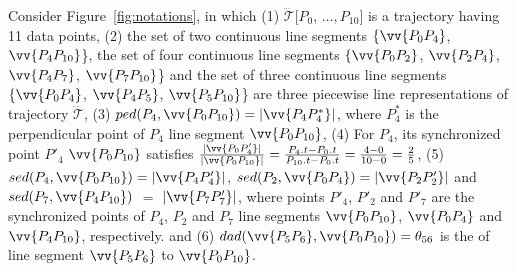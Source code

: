 \begin{example}
	\label{exm-notations}
	Consider Figure~\ref{fig:notations}, in which
	(1) $\dddot{\mathcal{T}}[P_0$, $\ldots, P_{10}]$ is a trajectory having 11 data points,
    (2) the set of two continuous line segments $\{\vv{P_0P_4}$, $\vv{P_4P_{10}}$\}, the set of four continuous line segments $\{\vv{P_0P_2}$, $\vv{P_2P_4}$, $\vv{P_4P_7}$, $\vv{P_7P_{10}}$\} and the set of three continuous line segments $\{\vv{P_0P_4}$, $\vv{P_4P_5}$, $\vv{P_5P_{10}}$\} are three piecewise line representations of trajectory $\dddot{\mathcal{T}}$,
	(3) $ped(P_4, \vv{P_0P_{10}})=|\vv{P_4P^*_4}|$, where $P^*_4$ is the perpendicular point of $P_4$ \wrt line segment $\vv{P_0P_{10}}$,
	(4) For $P_4$, its synchronized point $P'_4$ \wrt $\vv{P_0P_{10}}$ satisfies $\frac{|\vv{P_0P'_4}|}{|\vv{P_0P_{10}}|} = \frac{P_4.t - P_0.t}{P_{10}.t-P_0.t} = \frac{4-0}{10-0}= \frac{2}{5}$,
	(5) $sed(P_4, \vv{P_0P_{10}})= |\vv{P_4P'_4}|$, $sed(P_2, \vv{P_0P_{4}})= |\vv{P_2P'_2}|$ and $sed(P_7, \vv{P_4P_{10}})$ $=$ $|\vv{P_7P'_7}|$,
	where points $P'_4$, $P'_2$ and $P'_7$ are the synchronized points of $P_4$, $P_2$ and $P_7$ \wrt line segments $\vv{P_0P_{10}}$, $\vv{P_0P_{4}}$ and $\vv{P_4P_{10}}$, respectively.  and
    (6) $dad(\vv{P_5P_6}, \vv{P_0P_{10}})=\theta_{56}$ is the \dad of line segment $\vv{P_5P_6}$ to $\vv{P_0P_{10}}$.
\end{example}





